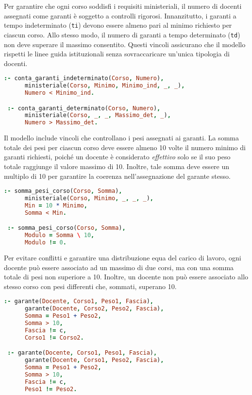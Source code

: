 Per garantire che ogni corso soddisfi i requisiti ministeriali, il numero di docenti assegnati 
come garanti è soggetto a controlli rigorosi. Innanzitutto, i garanti a tempo indeterminato 
(\texttt{ti}) devono essere almeno pari al minimo richiesto per ciascun corso. Allo stesso modo, 
il numero di garanti a tempo determinato (\texttt{td}) non deve superare il massimo consentito. 
Questi vincoli assicurano che il modello rispetti le linee guida istituzionali senza 
sovraccaricare un'unica tipologia di docenti.

\begin{lstlisting}[language=prolog, caption={Vincoli su garanti a tempo indeterminato e determinato.}]
 :- conta_garanti_indeterminato(Corso, Numero),
      ministeriale(Corso, Minimo, Minimo_ind, _, _),
      Numero < Minimo_ind.

 :- conta_garanti_determinato(Corso, Numero),
      ministeriale(Corso, _, _, Massimo_det, _),
      Numero > Massimo_det.
\end{lstlisting}

Il modello include vincoli che controllano i pesi assegnati ai garanti. La somma totale dei 
pesi per ciascun corso deve essere almeno 10 volte il numero minimo di garanti richiesti, 
poiché un docente è considerato \textit{effettivo} solo se il suo peso totale raggiunge il valore 
massimo di 10. Inoltre, tale somma deve essere un multiplo di 10 per garantire la coerenza 
nell'assegnazione del garante stesso.

\begin{lstlisting}[language=prolog, caption={Vincoli sui pesi assegnati ai garanti.}]
 :- somma_pesi_corso(Corso, Somma),
      ministeriale(Corso, Minimo, _, _, _),
      Min = 10 * Minimo,
      Somma < Min.

 :- somma_pesi_corso(Corso, Somma),
      Modulo = Somma \ 10,
      Modulo != 0.
\end{lstlisting}

Per evitare conflitti e garantire una distribuzione equa del carico di lavoro, ogni docente 
può essere associato ad un massimo di due corsi, ma con una somma totale di pesi non superiore 
a 10. Inoltre, un docente non può essere associato allo stesso corso con pesi differenti che, 
sommati, superano 10.

\begin{lstlisting}[language=prolog, caption={Vincoli sulla distribuzione dei pesi per docente.}]
 :- garante(Docente, Corso1, Peso1, Fascia),
      garante(Docente, Corso2, Peso2, Fascia),
      Somma = Peso1 + Peso2,
      Somma > 10,
      Fascia != c,
      Corso1 != Corso2.

 :- garante(Docente, Corso1, Peso1, Fascia),
      garante(Docente, Corso1, Peso2, Fascia),
      Somma = Peso1 + Peso2,
      Somma > 10,
      Fascia != c,
      Peso1 != Peso2.
\end{lstlisting}

